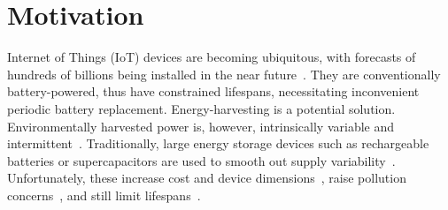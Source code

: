 
\section{Motivation} \label{section:intro}


Internet of Things (IoT) devices are becoming ubiquitous, with forecasts of hundreds of billions being installed in the near future~\cite{sparks2017trillion}.
They are conventionally battery-powered, thus have constrained lifespans, necessitating inconvenient periodic battery replacement. %
Energy-harvesting is a potential solution. Environmentally harvested power is, however, intrinsically variable and intermittent~\cite{4494336}. Traditionally, large energy storage devices such as rechargeable batteries or supercapacitors are used to smooth out supply variability~\cite{Kansal:2007:PME:1274858.1274870}. Unfortunately, these increase cost and device dimensions~\cite{4494753}, raise pollution concerns~\cite{LIU2014210}, and still limit lifespans~\cite{AKHTAR2015769}. 

